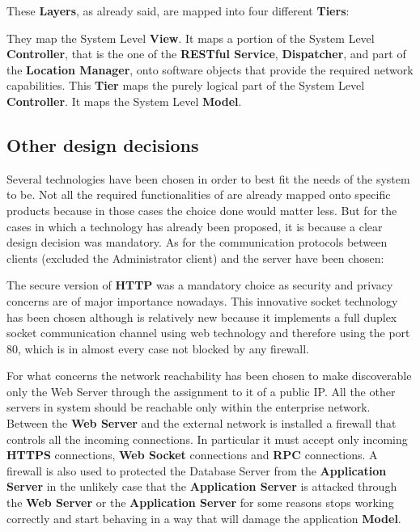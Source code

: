 These \textbf{Layers}, as already said, are mapped into four different \textbf{Tiers}:
\begin{itemize}
	 They map the System Level \textbf{View}.
	 It maps a portion of the System Level \textbf{Controller}, that is the one of the \textbf{RESTful Service}, \textbf{Dispatcher}, and part of the \textbf{Location Manager}, onto software objects that provide the required network capabilities.
	 This \textbf{Tier} maps the purely logical part of the System Level \textbf{Controller}.
	 It maps the System Level \textbf{Model}.
\end{itemize}
%
\subsection{Other design decisions}
Several technologies have been chosen in order to best fit the needs of the system to be.
Not all the required functionalities of \myTaxiService{} are already mapped onto specific products because in those cases the choice done would matter less.
But for the cases in which a technology has already been proposed, it is because a clear design decision was mandatory.
As for the communication protocols between clients (excluded the Administrator client) and the server have been chosen:
\begin{itemize}
	 The secure version of \textbf{HTTP} was a mandatory choice as security and privacy concerns are of major importance nowadays.
	 This innovative socket technology has been chosen although is relatively new because it implements a full duplex socket communication channel using web technology and therefore using the port 80, which is in almost every case not blocked by any firewall.
\end{itemize}
For what concerns the network reachability has been chosen to make discoverable only the Web Server through the assignment to it of a public IP.
All the other servers in \myTaxiService{} system should be reachable only within the enterprise network.
Between the \textbf{Web Server} and the external network is installed a firewall that controls all the incoming connections.
In particular it must accept only incoming \textbf{HTTPS} connections, \textbf{Web Socket} connections and \textbf{RPC} connections.
A firewall is also used to protected the Database Server from the \textbf{Application Server} in the unlikely case that the \textbf{Application Server} is attacked through the \textbf{Web Server} or the \textbf{Application Server} for some reasons stops working correctly and start behaving in a way that will damage the application \textbf{Model}.
